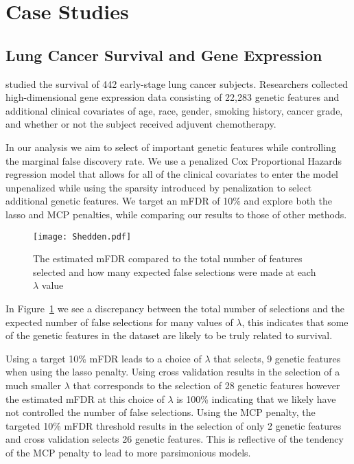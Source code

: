 \section{Case Studies}

\subsection{Lung Cancer Survival and Gene Expression}
\citet{Shedden2008} studied the survival of 442 early-stage lung cancer subjects. Researchers collected high-dimensional gene expression data consisting of 22,283 genetic features and additional clinical covariates of age, race, gender, smoking history, cancer grade, and whether or not the subject received adjuvent chemotherapy.  

In our analysis we aim to select of important genetic features while controlling the marginal false discovery rate.  We use a penalized Cox Proportional Hazards regression model that allows for all of the clinical covariates to enter the model unpenalized while using the sparsity introduced by penalization to select additional genetic features.  We target an mFDR of 10\% and explore both the lasso and MCP penalties, while comparing our results to those of other methods.

\begin{figure} [!htb]
 \centering
  \texttt{[image: Shedden.pdf]}
  \caption{\label{Fig:Shedden} The estimated mFDR compared to the total number of features selected and how many expected false selections were made at each $\lambda$ value}
\end{figure}

In Figure~\ref{Fig:Shedden} we see a discrepancy between the total number of selections and the expected number of false selections for many values of $\lambda$, this indicates that some of the genetic features in the dataset are likely to be truly related to survival. 

Using a target 10\% mFDR leads to a choice of $\lambda$ that selects, 9 genetic features when using the lasso penalty. Using cross validation results in the selection of a much smaller $\lambda$ that corresponds to the selection of 28 genetic features however the estimated mFDR at this choice of $\lambda$ is 100\% indicating that we likely have not controlled the number of false selections. Using the MCP penalty, the targeted 10\% mFDR threshold results in the selection of only 2 genetic features and cross validation selects 26 genetic features.  This is reflective of the tendency of the MCP penalty to lead to more parsimonious models.

